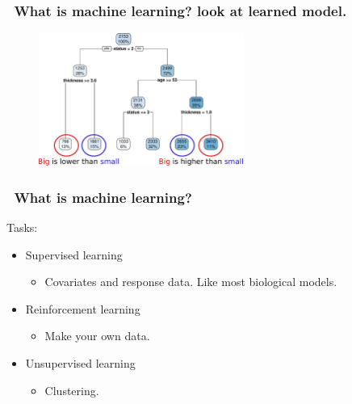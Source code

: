 \documentclass[handout, aspectratio = 169]{beamer}
\begin{document}
\begin{frame}
\frametitle{\insertframenumber~What is machine learning? look at learned model.}
\vspace{2mm}
\begin{figure}
    \includegraphics[width = 0.6\textwidth]{rpart_annotate.pdf}
\end{figure} 

\end{frame} 




\begin{frame}
\frametitle{\insertframenumber~What is machine learning?}
Tasks:
\begin{itemize}
\item Supervised learning
\begin{itemize}
\item Covariates and response data. Like most biological models.
\end{itemize}
\item Reinforcement learning
\begin{itemize}
\item Make your own data.
\end{itemize}
\item Unsupervised learning
\begin{itemize}
\item Clustering.
\end{itemize}
\end{itemize}
\end{frame} 
\end{document}
